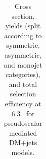 \begin{table}
{\begin{tabular}{rrlrrrrr}
    \hline\hline
    \end{tabular}
    }
    \caption{Cross section, yields (split according to symmetric, asymmetric, 
        and monojet categories), and total selection efficiency at $6.3$~\ifb 
        for pseudoscalar mediated DM+jets models.}
    \label{tab:DMPS_yld}
\end{table}


